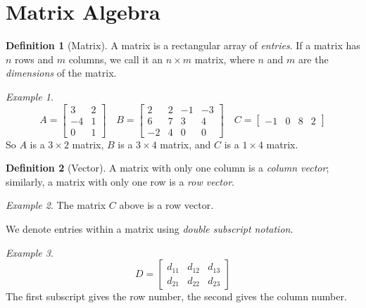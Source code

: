 \documentclass[10pt, a4paper]{amsart}
\theoremstyle{definition}
\newtheorem{defn}{Definition}
\theoremstyle{remark}
\newtheorem{ex}{Example}
\begin{document}
\section{Matrix Algebra}
\begin{defn}[Matrix]
  A matrix is a rectangular array of \emph{entries}. If a matrix has $ n $ rows and $ m $ columns, we call
  it an $ n \times m$ matrix, where $ n $ and $ m $ are the \emph{dimensions} of the matrix.
\end{defn}
\begin{ex}
  \begin{displaymath}
    A = \begin{bmatrix} 3 & 2 \\ -4 & 1 \\ 0 & 1 \end{bmatrix}\quad
    B = \begin{bmatrix} 2 & 2 & -1 & -3 \\ 6 & 7 & 3 & 4 \\ -2 & 4 & 0 & 0 \end{bmatrix}\quad
    C = \begin{bmatrix} -1 & 0 & 8 & 2 \end{bmatrix}
  \end{displaymath}
  So $ A $ is a $ 3 \times 2 $ matrix, $ B $ is a $ 3 \times 4 $ matrix, and $ C $ is a $ 1 \times 4 $ matrix.
\end{ex}

\begin{defn}[Vector]
  A matrix with only one column is a \emph{column vector}; similarly, a matrix with only one row is
  a \emph{row vector}.
  \label{def:FormalVector}
\end{defn}

\begin{ex}
  The matrix $ C $ above is a row vector.
\end{ex}

We denote entries within a matrix using \emph{double subscript notation}.

\begin{ex}
  \begin{displaymath}
    D = \begin{bmatrix} d_{11} & d_{12} & d_{13} \\ d_{21} & d_{22} & d_{23} \end{bmatrix}
  \end{displaymath}
  The first subscript gives the row number, the second gives the column number.
\end{ex}
\end{document}
